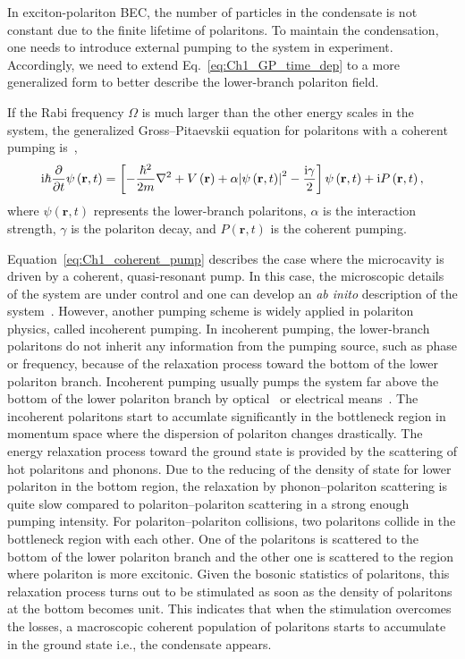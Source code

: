 In exciton-polariton BEC, the number of particles in the condensate is not constant due to the finite lifetime of polaritons.
To maintain the condensation, one needs to introduce external pumping to the system in experiment.
Accordingly, we need to extend Eq.~\eqref{eq:Ch1_GP_time_dep} to a more generalized form to better describe the lower-branch polariton field.

If the Rabi frequency $\Omega$ is much larger than the other energy scales in the system, the generalized Gross--Pitaevskii equation for polaritons with a coherent pumping is~\cite{Carusotto:2013aa},
%
\begin{equation}
    \mathrm{i}\hbar \frac{\partial}{\partial t} \psi\left(\mathbf{r},t\right) = \left[ -\frac{\hbar^2}{2m}\nabla^2 + V\left(\mathbf{r}\right) + \alpha \abs{\psi\left(\mathbf{r},t\right)}^2 -\frac{\mathrm{i} \gamma}{2} \right] \psi\left(\mathbf{r},t\right) +  \mathrm{i} P\left(\mathbf{r},t\right),
    \label{eq:Ch1_coherent_pump}
\end{equation}
%
where $\psi\left(\mathbf{r},t\right)$ represents the lower-branch polaritons, $\alpha$ is the interaction strength, $\gamma$ is the polariton decay, and $P\left(\mathbf{r},t\right)$ is the coherent pumping.

Equation~\eqref{eq:Ch1_coherent_pump} describes the case where the microcavity is driven by a coherent, quasi-resonant pump.
In this case, the microscopic details of the system are under control and one can develop an \textit{ab inito} description of the system~\cite{Carusotto:2013aa}.
However, another pumping scheme is widely applied in polariton physics, called incoherent pumping.
In incoherent pumping, the lower-branch polaritons do not inherit any information from the pumping source, such as phase or frequency, because of the relaxation process toward the bottom of the lower polariton branch.
Incoherent pumping usually pumps the system far above the bottom of the lower polariton branch by optical~\cite{PhysRevB.76.201305,Deng15318,PhysRevB.72.201301} or electrical means~\cite{Schneider:2013aa,PhysRevB.77.113303}.
The incoherent polaritons start to accumlate significantly in the bottleneck region in momentum space where the dispersion of polariton changes drastically.
The energy relaxation process toward the ground state is provided by the scattering of hot polaritons and phonons.
Due to the reducing of the density of state for lower polariton in the bottom region, the relaxation by phonon--polariton scattering is quite slow compared to polariton--polariton scattering in a strong enough pumping intensity.
For polariton--polariton collisions, two polaritons collide in the bottleneck region with each other.
One of the polaritons is scattered to the bottom of the lower polariton branch and the other one is scattered to the region where polariton is more excitonic.
Given the bosonic statistics of polaritons, this relaxation process turns out to be stimulated as soon as the density of polaritons at the bottom becomes unit.
This indicates that when the stimulation overcomes the losses, a macroscopic coherent population of polaritons starts to accumulate in the ground state i.e., the condensate appears.

